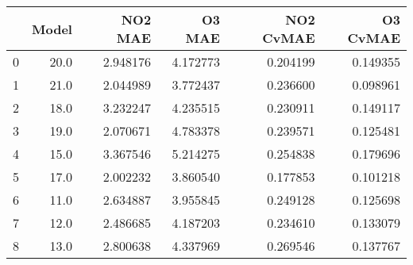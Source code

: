 \begin{tabular}{lrrrrr}
\toprule
{} &  Model &   NO2 MAE &    O3 MAE &  NO2 CvMAE &  O3 CvMAE \\
\midrule
0 &   20.0 &  2.948176 &  4.172773 &   0.204199 &  0.149355 \\
1 &   21.0 &  2.044989 &  3.772437 &   0.236600 &  0.098961 \\
2 &   18.0 &  3.232247 &  4.235515 &   0.230911 &  0.149117 \\
3 &   19.0 &  2.070671 &  4.783378 &   0.239571 &  0.125481 \\
4 &   15.0 &  3.367546 &  5.214275 &   0.254838 &  0.179696 \\
5 &   17.0 &  2.002232 &  3.860540 &   0.177853 &  0.101218 \\
6 &   11.0 &  2.634887 &  3.955845 &   0.249128 &  0.125698 \\
7 &   12.0 &  2.486685 &  4.187203 &   0.234610 &  0.133079 \\
8 &   13.0 &  2.800638 &  4.337969 &   0.269546 &  0.137767 \\
\bottomrule
\end{tabular}
